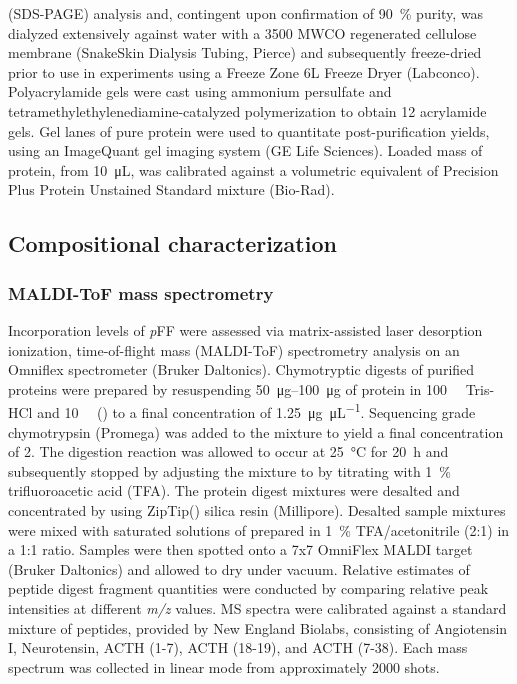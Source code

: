 \begin{refsection}
(SDS-PAGE) analysis and, contingent upon confirmation of \SI{90}{\percent}
purity, was dialyzed extensively against water with a 3500 MWCO regenerated
cellulose membrane (SnakeSkin Dialysis Tubing, Pierce) and subsequently
freeze-dried prior to use in experiments using a Freeze Zone 6L Freeze Dryer
(Labconco). Polyacrylamide gels were cast using ammonium persulfate and
tetramethylethylenediamine-catalyzed polymerization to obtain \SI{12}{\wtper}
acrylamide gels. Gel lanes of pure protein were used to quantitate
post-purification yields, using an ImageQuant gel imaging system (GE Life
Sciences). Loaded mass of protein, from \SI{10}{\uL}, was calibrated against a
volumetric equivalent of Precision Plus Protein Unstained Standard mixture
(Bio-Rad).

\subsection{Compositional characterization}
\subsubsection{MALDI-ToF mass spectrometry}

Incorporation levels of \emph{p}FF were assessed via matrix-assisted laser desorption
ionization, time-of-flight mass (MALDI-ToF) spectrometry analysis on an Omniflex
spectrometer (Bruker Daltonics). Chymotryptic digests of purified proteins were
prepared by resuspending \SIrange[range-phrase=--]{50}{100}{\ug} of protein in
\SI{100}{\milli\moLar} Tris-HCl and \SI{10}{\milli\moLar}  ()
to a final concentration of \SI{1.25}{\ug\per\uL}. Sequencing grade chymotrypsin
(Promega) was added to the mixture to yield a final concentration of
\SI{2}{\wtperwt}. The digestion reaction was allowed to occur at \SI{25}{\celsius}
for \SI{20}{\hour} and subsequently stopped by adjusting the mixture to  by
titrating with \SI{1}{\percent} trifluoroacetic acid (TFA). The protein digest
mixtures were desalted and concentrated by using ZipTip() silica resin
(Millipore).  Desalted sample mixtures were mixed with saturated solutions of
 prepared in \SI{1}{\percent}
TFA/acetonitrile (2:1) in a 1:1 ratio. Samples were then spotted onto a 7x7
OmniFlex MALDI target (Bruker Daltonics) and allowed to dry under vacuum.
Relative estimates of peptide digest fragment quantities were conducted by
comparing relative peak intensities at different \emph{m/z} values. MS spectra
were calibrated against a standard mixture of peptides, provided by New England
Biolabs, consisting of Angiotensin I, Neurotensin, ACTH (1-7), ACTH (18-19),
and ACTH (7-38). Each mass spectrum was collected in linear mode from
approximately 2000 shots.


\end{refsection}
